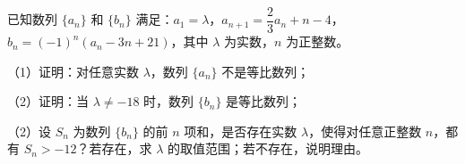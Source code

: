 \begin{question}
已知数列 $\{a_n\}$ 和 $\{b_n\}$ 满足：$a_1=\lambda$，$a_{n+1}=\dfrac23a_n+n-4$，$b_n=(-1)^n(a_n-3n+21)$，其中 $\lambda$ 为实数，$n$ 为正整数。

（1）证明：对任意实数 $\lambda$，数列 $\{a_n\}$ 不是等比数列；

（2）证明：当 $\lambda\neq-18$ 时，数列 $\{b_n\}$ 是等比数列；

（2）设 $S_n$ 为数列 $\{b_n\}$ 的前 $n$ 项和，是否存在实数 $\lambda$，使得对任意正整数 $n$，都有 $S_n>-12$？若存在，求 $\lambda$ 的取值范围；若不存在，说明理由。

\end{question}